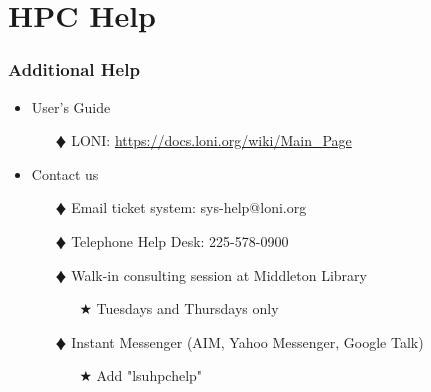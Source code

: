 \documentclass[slidestop,mathserif,compress,xcolor=svgnames,table]{beamer}
\newenvironment{eblock}[0]
{
\begin{beamerboxesrounded}[upper=uppercol2,lower=lowercol2,shadow=true]}
{\end{beamerboxesrounded}}
\begin{document}
\section{HPC Help}
\begin{frame}
  \frametitle{\small Additional Help}
  \begin{itemize}
    \item User's Guide
    \begin{enumerate}
      \item[$\vardiamond$]LONI: \url{https://docs.loni.org/wiki/Main_Page}
    \end{enumerate}
    \item Contact us
    \begin{enumerate}
      \item[$\vardiamond$]Email ticket system: sys-help@loni.org
      \item[$\vardiamond$]Telephone Help Desk: 225-578-0900
      \item[$\vardiamond$]Walk-in consulting session at Middleton Library
      \begin{enumerate}
	\item[$\bigstar$]Tuesdays and Thursdays only
      \end{enumerate}
      \item[$\vardiamond$]Instant Messenger (AIM, Yahoo Messenger, Google Talk)
      \begin{enumerate}
	\item[$\bigstar$]Add "lsuhpchelp"
      \end{enumerate}
    \end{enumerate}
  \end{itemize}
\end{frame} 

\begin{frame}
  \frametitle{\small  }
  \vspace{1.2cm}
  \begin{eblock}{}
  \end{eblock}
\end{frame}
\end{document}
